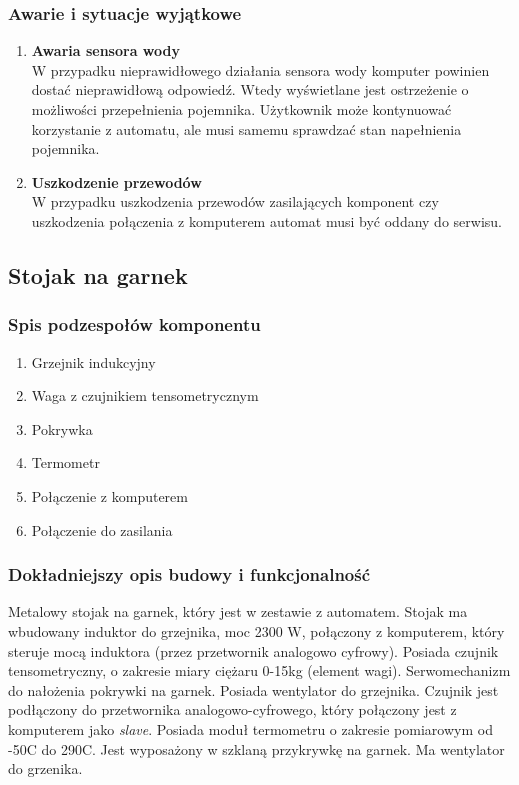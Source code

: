 \documentclass[12pt,a4paper,notitlepage]{article}
\begin{document}
\subsubsection{Awarie i sytuacje wyjątkowe}
\begin{enumerate}
  \item \textbf{Awaria sensora wody }\\
W przypadku nieprawidłowego działania sensora wody komputer powinien dostać nieprawidłową odpowiedź. Wtedy wyświetlane jest ostrzeżenie o możliwości przepełnienia pojemnika. Użytkownik może kontynuować korzystanie z automatu, ale musi samemu sprawdzać stan napełnienia pojemnika.
  \item \textbf{Uszkodzenie przewodów}\\
W przypadku uszkodzenia przewodów zasilających komponent czy uszkodzenia połączenia z komputerem automat musi być oddany do serwisu.
\end{enumerate}



\subsection{Stojak na garnek}
\subsubsection{Spis podzespołów komponentu}
\begin{enumerate}
  \item Grzejnik indukcyjny
  \item Waga z czujnikiem tensometrycznym
  \item Pokrywka
  \item Termometr
  \item Połączenie z komputerem
  \item Połączenie do zasilania
\end{enumerate}

\subsubsection{Dokładniejszy opis budowy i funkcjonalność}
Metalowy stojak na garnek, który jest w zestawie z automatem. Stojak ma wbudowany induktor do grzejnika, moc 2300 W, połączony z komputerem, który steruje mocą induktora (przez przetwornik analogowo cyfrowy). Posiada czujnik tensometryczny, o zakresie miary ciężaru 0-15kg (element wagi). Serwomechanizm do nałożenia pokrywki na garnek. Posiada wentylator do grzejnika. Czujnik jest podłączony do przetwornika analogowo-cyfrowego, który połączony jest z komputerem jako \emph{slave}. Posiada moduł termometru o zakresie pomiarowym od -50\degree C do 290\degree C. Jest wyposażony w szklaną przykrywkę na garnek. Ma wentylator do grzenika.
 
\end{document}
